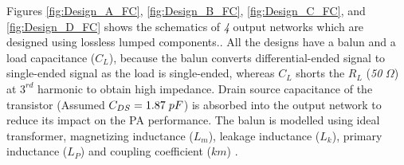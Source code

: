 \documentclass[conference]{IEEEtran}
\begin{document}
Figures \ref{fig:Design_A_FC}, \ref{fig:Design_B_FC}, \ref{fig:Design_C_FC}, and \ref{fig:Design_D_FC} shows the schematics of \textit{4} output networks which are designed using lossless lumped components.. 
All the designs have a balun and a load capacitance ($C_L$), because the balun converts differential-ended signal to single-ended signal as the load is single-ended, whereas $C_L$ shorts the $R_L$ (\textit{50} $\Omega$) at $3^{rd}$ harmonic to obtain high impedance. Drain source capacitance of the transistor (Assumed $C_{DS}=1.87\hspace{1mm}pF$) is absorbed into the output network to reduce its impact on the PA performance. The balun is modelled using ideal transformer, magnetizing inductance ($L_m$), leakage inductance ($L_k$), primary inductance ($L_P$) and coupling coefficient ($km$) \cite{Transformer_model}. 
\end{document}
